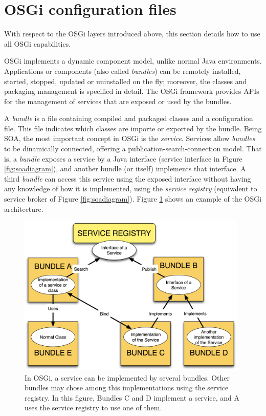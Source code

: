 \section{OSGi configuration files}
With respect to the OSGi layers introduced above, this section details how to use all OSGi capabilities. 

OSGi implements a dynamic component model, unlike normal Java
environments. Applications or components (also called
\emph{bundles}) can be remotely installed, started, stopped, updated
or uninstalled on the fly; moreover, the classes and
packaging management is specified in detail. The OSGi framework provides
APIs for the management of services that are exposed or used by the
bundles.

A {\em bundle} is a file containing compiled and packaged classes and a configuration file. This file indicates which classes are importe or exported by the bundle. Being SOA, the most important concept in OSGi is the {\em service}. Services allow {\em bundles} to be dinamically connected, offering a publication-search-connection model. That is, a {\em bundle} exposes a service by a Java interface (service interface in Figure \ref{fig:soadiagram}), and another bundle (or itself) implements that interface. A third {\em bundle} can access this service using the exposed interface without having any knowledge of how it is implemented, using the {\em service registry} (equivalent to service broker of Figure \ref{fig:soadiagram}). Figure \ref{OSGIDIAGRAM} shows an example of the OSGi architecture.


\begin{figure}
\centering
\includegraphics[width=26pc]{gfx/soa/bundles.jpg}
\caption{In OSGi, a service can be implemented by several bundles. Other bundles may chose among this implementations using the service registry. In this figure, Bundles C and D implement a service, and A uses the service registry to use one of them.}
\label{OSGIDIAGRAM}
\end{figure}



